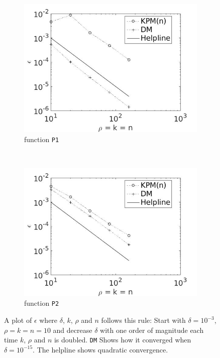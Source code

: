 \begin{figure}[H]
        \centering
        \begin{subfigure}[b]{0.45\textwidth}
                \includegraphics[width=\textwidth]{fig/sisteplot1}
                \caption{function \texttt{P1}}
                \label{fig:siste1}
        \end{subfigure}
~
        \begin{subfigure}[b]{0.45\textwidth}
                \includegraphics[width=\textwidth]{fig/sisteplot2}
                \caption{ function \texttt{P2}}
                \label{fig:siste2}
        \end{subfigure}
        \caption{A plot of $\epsilon$ where $\delta$, $k$, $\rho$ and $n$ follows this rule: Start with $\delta=10^{-3}$, $\rho = k = n = 10$ and decrease $\delta$ with one order of magnitude each time $k$, $\rho$ and $n$ is doubled. \texttt{DM} Shows how it converged when $\delta = 10^{-15}$. The helpline shows quadratic convergence.} \label{fig:siste}
\end{figure}

